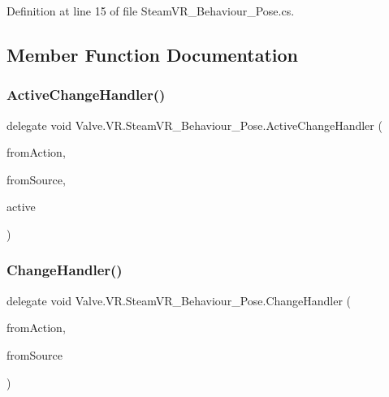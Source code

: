 Definition at line 15 of file Steam\+V\+R\+\_\+\+Behaviour\+\_\+\+Pose.\+cs.



\subsection{Member Function Documentation}
\mbox{\label{class_valve_1_1_v_r_1_1_steam_v_r___behaviour___pose_a7730a086ee26d198ce89285c305151d1}} 
\subsubsection{\texorpdfstring{ActiveChangeHandler()}{ActiveChangeHandler()}}
{\footnotesize\ttfamily delegate void Valve.\+V\+R.\+Steam\+V\+R\+\_\+\+Behaviour\+\_\+\+Pose.\+Active\+Change\+Handler (\begin{DoxyParamCaption}\item[{\mbox{\hyperlink{class_valve_1_1_v_r_1_1_steam_v_r___behaviour___pose}{Steam\+V\+R\+\_\+\+Behaviour\+\_\+\+Pose}}}]{from\+Action,  }\item[{\mbox{\hyperlink{namespace_valve_1_1_v_r_a82e5bf501cc3aa155444ee3f0662853f}{Steam\+V\+R\+\_\+\+Input\+\_\+\+Sources}}}]{from\+Source,  }\item[{bool}]{active }\end{DoxyParamCaption})}

\mbox{\label{class_valve_1_1_v_r_1_1_steam_v_r___behaviour___pose_abfdfc35f49754198589572579c59bcc2}} 
\subsubsection{\texorpdfstring{ChangeHandler()}{ChangeHandler()}}
{\footnotesize\ttfamily delegate void Valve.\+V\+R.\+Steam\+V\+R\+\_\+\+Behaviour\+\_\+\+Pose.\+Change\+Handler (\begin{DoxyParamCaption}\item[{\mbox{\hyperlink{class_valve_1_1_v_r_1_1_steam_v_r___behaviour___pose}{Steam\+V\+R\+\_\+\+Behaviour\+\_\+\+Pose}}}]{from\+Action,  }\item[{\mbox{\hyperlink{namespace_valve_1_1_v_r_a82e5bf501cc3aa155444ee3f0662853f}{Steam\+V\+R\+\_\+\+Input\+\_\+\+Sources}}}]{from\+Source }\end{DoxyParamCaption})}

